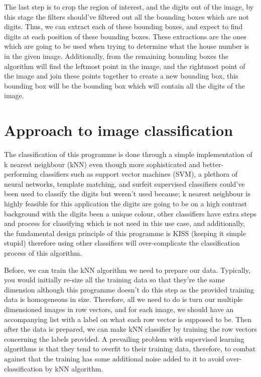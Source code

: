 \documentclass[
	12pt, %
]{fphw}
\begin{document}
The last step is to crop the region of interest, and the digits out of the image, by this stage the filters should’ve filtered out all the bounding boxes which are not digits. Thus, we can extract each of these bounding boxes, and expect to find digits at each position of these bounding boxes. These extractions are the ones which are going to be used when trying to determine what the house number is in the given image. Additionally, from the remaining bounding boxes the algorithm will find the leftmost point in the image, and the rightmost point of the image and join these points together to create a new bounding box, this bounding box will be the bounding box which will contain all the digits of the image.

\section{Approach to image classification}

The classification of this programme is done through a simple implementation of k nearest neighbour (kNN) even though more sophisticated and better-performing classifiers such as support vector machines (SVM), a plethora of neural networks, template matching, and surfeit supervised classifiers could’ve been used to classify the digits but weren’t used because; k nearest neighbour is highly feasible for this application the digits are going to be on a high contrast background with the digits been a unique colour, other classifiers have extra steps and process for classifying which is not need in this use case, and additionally, the fundamental design principle of this programme is KISS (keeping it simple stupid) therefore using other classifiers will over-complicate the classification process of this algorithm.\par

Before, we can train the kNN algorithm we need to prepare our data. Typically, you would initially re-size all the training data so that they’re the same dimension although this programme doesn’t do this step as the provided training data is homogeneous in size. Therefore, all we need to do is turn our multiple dimensioned images in row vectors, and for each image, we should have an accompanying list with a label on what each row vector is supposed to be. Then after the data is prepared, we can make kNN classifier by training the row vectors concerning the labels provided. A prevailing problem with supervised learning algorithms is that they tend to overfit to their training data, therefore, to combat against that the training has some additional noise added to it to avoid over-classification by kNN algorithm. \par
\end{document}
